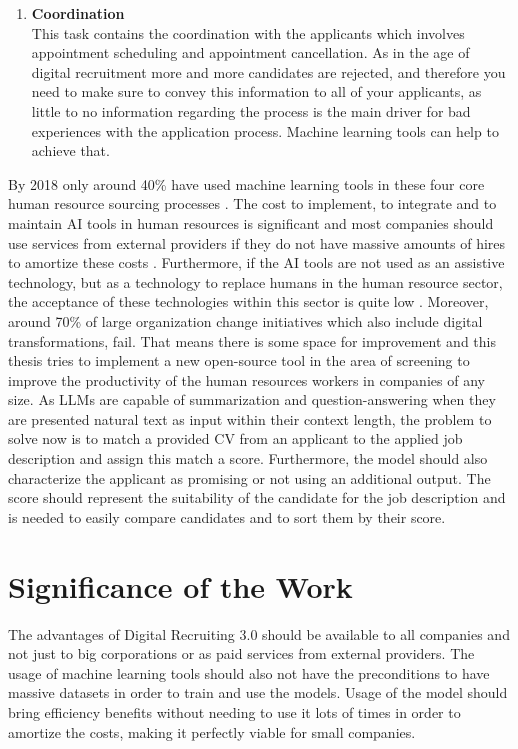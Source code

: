 \documentclass[draft,final]{thesisclass} %
\begin{document}
\begin{enumerate}
    \item \textbf{Coordination}\\
    This task contains the coordination with the applicants which involves appointment scheduling and appointment cancellation. As in the age of digital recruitment more and more candidates are rejected, and therefore you need to make sure to convey this information to all of your applicants, as little to no information regarding the process is the main driver for bad experiences with the application process. Machine learning tools can help to achieve that.
\end{enumerate}
By 2018 only around 40\% have used machine learning tools in these four core human resource sourcing processes \parencite[4]{ai_recruiting}.
The cost to implement, to integrate and to maintain \acs{AI} tools in human resources is significant and most companies should use services from external providers if they do not have massive amounts of hires to amortize these costs \parencite[8]{ai_recruiting}.
Furthermore, if the \acs{AI} tools are not used as an assistive technology, but as a technology to replace humans in the human resource sector, the acceptance of these technologies within this sector is quite low \parencite[9]{ai_recruiting}.
Moreover, around 70\% of large organization change initiatives which also include digital transformations, fail.
That means there is some space for improvement and this thesis tries to implement a new open-source tool in the area of screening to improve the productivity of the human resources workers in companies of any size.
As \acs{LLM}s are capable of summarization and question-answering when they are presented natural text as input within their context length, the problem to solve now is to match a provided \acs{CV} from an applicant to the applied job description and assign this match a score.
Furthermore, the model should also characterize the applicant as promising or not using an additional output.
The score should represent the suitability of the candidate for the job description and is needed to easily compare candidates and to sort them by their score.

\section{Significance of the Work} \label{significance_of_the_work}
The advantages of Digital Recruiting 3.0 should be available to all companies and not just to big corporations or as paid services from external providers.
The usage of machine learning tools should also not have the preconditions to have massive datasets in order to train and use the models.
Usage of the model should bring efficiency benefits without needing to use it lots of times in order to amortize the costs, making it perfectly viable for small companies.
\end{document}

